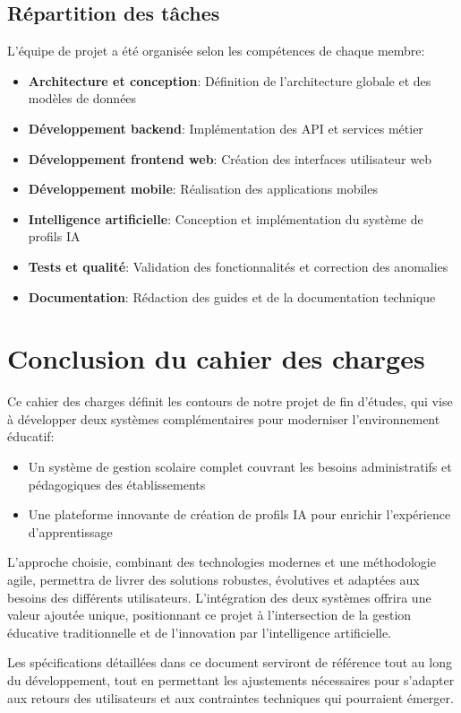 \subsection{Répartition des tâches}

L'équipe de projet a été organisée selon les compétences de chaque membre:

\begin{itemize}
  \item \textbf{Architecture et conception}: Définition de l'architecture globale et des modèles de données
  
  \item \textbf{Développement backend}: Implémentation des API et services métier
  
  \item \textbf{Développement frontend web}: Création des interfaces utilisateur web
  
  \item \textbf{Développement mobile}: Réalisation des applications mobiles
  
  \item \textbf{Intelligence artificielle}: Conception et implémentation du système de profils IA
  
  \item \textbf{Tests et qualité}: Validation des fonctionnalités et correction des anomalies
  
  \item \textbf{Documentation}: Rédaction des guides et de la documentation technique
\end{itemize}

\section{Conclusion du cahier des charges}

Ce cahier des charges définit les contours de notre projet de fin d'études, qui vise à développer deux systèmes complémentaires pour moderniser l'environnement éducatif:

\begin{itemize}
  \item Un système de gestion scolaire complet couvrant les besoins administratifs et pédagogiques des établissements
  
  \item Une plateforme innovante de création de profils IA pour enrichir l'expérience d'apprentissage
\end{itemize}

L'approche choisie, combinant des technologies modernes et une méthodologie agile, permettra de livrer des solutions robustes, évolutives et adaptées aux besoins des différents utilisateurs. L'intégration des deux systèmes offrira une valeur ajoutée unique, positionnant ce projet à l'intersection de la gestion éducative traditionnelle et de l'innovation par l'intelligence artificielle.

Les spécifications détaillées dans ce document serviront de référence tout au long du développement, tout en permettant les ajustements nécessaires pour s'adapter aux retours des utilisateurs et aux contraintes techniques qui pourraient émerger. 